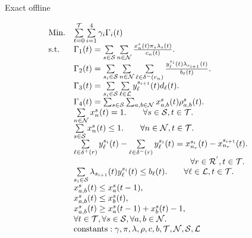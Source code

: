 \begin{problemenv}
	\caption{Exact offline \myproblem}
	\label{formulation:offline}
	\begin{equation}
		\begin{array}{ll@{}ll}
			\text{Min.}   & \sum\limits_{t=0}^{\mathcal{T}} \sum\limits_{i=1}^{4} \gamma_{i}\Gamma_{i}(t)\\
			\text{s.t.} 
			&\Gamma_{1}(t) = \sum\limits_{s\in\mc{S}} 
			\sum\limits_{n\in\mc{N}} 
			\frac{x_{n}^{s}(t)\pi_{s}\lambda_{s}(t)}{c_{n}(t)}.\\
			&    \Gamma_{2}(t) = \sum\limits_{s_{i}\in\mc{S}} 
			\sum\limits_{n\in\mc{N}} 
			\sum\limits_{\ell\in \delta^{-}(r_n)} 
			\frac{y_{\ell}^{s_{i}}(t)\lambda_{s_{i+1}}(t)}{b_{\ell}(t)}.\\
			&\Gamma_{3}(t) = \sum\limits_{s_{i}\in\mc{S}}
			\sum\limits_{\ell\in\mc{L}} 
			y_{\ell}^{s_{i+1}}(t)d_{\ell}(t).\\
			&\Gamma_{4}(t) = \sum_{s\in\mc{S}}
			\sum_{a,b\in\mc{N}}
			x^s_{a,b}(t)\rho_{a,b}^{s}(t).\\
			&    \sum\limits_{n\in\mc{N}} x_{n}^{s}(t) = 1. 
			\qquad 
			\forall s\in\mc{S}, t\in\mc{T}.\\
			& \sum\limits_{s\in\mc{S}} x_{n}^{s}(t) \le 1. 
			\qquad 
			\forall n\in\mc{N}, t\in\mc{T}.\\
			&\sum\limits_{\ell\in\delta^{+}(r)} y_{\ell}^{s_{i}}(t)
			- \sum\limits_{\ell\in\delta^{-}(r)} y_{\ell}^{s_{i}}(t)
			= x_{n_r}^{s_{i}}(t) - x_{n_r}^{s_{i+1}}(t).
			\qquad \\
			&\qquad\qquad\qquad\qquad\qquad\qquad\qquad\forall r \in\mc{R}^{'},t\in\mc{T}.\\
			&  \sum\limits_{s_{i}\in\mc{S}} \lambda_{s_{i+1}}(t)y_{\ell}^{s_{i}}(t) \le     b_{\ell}(t).
			\qquad
			\forall \ell\in\mc{L}, t\in\mc{T}.\\
			& x^s_{a,b}(t) \leq x^s_a(t-1), \\
			&x^s_{a,b}(t) \leq x^s_b(t),\\
			& x^s_{a,b}(t)  \geq  x^s_a(t-1) + x^s_b(t) -1,\\
			& \forall t\in \mathcal{T}, \forall s \in \mathcal{S}, \forall a,b \in \mathcal{N}.\\     
			
			&\text{constants}:\gamma,  \pi, \lambda, \rho, c, b, \mathcal{T}, \mathcal{N}, \mathcal{S}, \mathcal{L}\\
		\end{array}
	\end{equation}
\end{problemenv}


